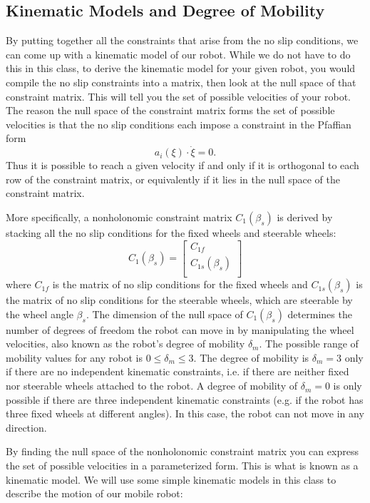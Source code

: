 \documentclass[twoside]{article}
\begin{document}
\subsection*{Kinematic Models and Degree of Mobility}

By putting together all the constraints that arise from the no slip conditions, we can come up with a kinematic model of our robot. While we do not have to do this in this class, to derive the kinematic model for your given robot, you would compile the no slip constraints into a matrix, then look at the null space of that constraint matrix. This will tell you the set of possible velocities of your robot. The reason the null space of the constraint matrix forms the set of possible velocities is that the no slip conditions each impose a constraint in the Pfaffian form $$a_i(\xi) \cdot \dot{\xi} = 0.$$ Thus it is possible to reach a given velocity if and only if it is orthogonal to each row of the constraint matrix, or equivalently if it lies in the null space of the constraint matrix.

More specifically, a nonholonomic constraint matrix $C_1(\beta_s)$ is derived by stacking all the no slip conditions for the fixed wheels and steerable wheels:
$$C_1(\beta_s)= \begin{bmatrix}
           C_{1f} \\
           C_{1s}(\beta_s) \\
         \end{bmatrix}$$
where $C_{1f}$ is the matrix of no slip conditions for the fixed wheels and $C_{1s}(\beta_s)$ is the matrix of no slip conditions for the steerable wheels, which are steerable by the wheel angle $\beta_s$. The dimension of the null space of $C_1(\beta_s)$ determines the number of degrees of freedom the robot can move in by manipulating the wheel velocities, also known as the robot's degree of mobility $\delta_m$. The possible range of mobility values for any robot is $0 \leq \delta_m \leq 3.$ The degree of mobility is $\delta_m=3$ only if there are no independent kinematic constraints, i.e. if there are neither fixed nor steerable wheels attached to the robot. A degree of mobility of $\delta_m=0$ is only possible if there are three independent kinematic constraints (e.g. if the robot has three fixed wheels at different angles). In this case, the robot can not move in any direction.

By finding the null space of the nonholonomic constraint matrix you can express the set of possible velocities in a parameterized form. This is what is known as a kinematic model. We will use some simple kinematic models in this class to describe the motion of our mobile robot:
\end{document}
